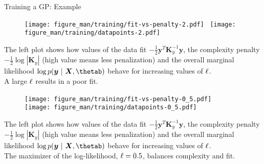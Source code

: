 \begin{vbframe}{Training a GP: Example}
\framebreak

\begin{figure}
	\texttt{[image: figure\_man/training/fit-vs-penalty-2.pdf]}~	\texttt{[image: figure\_man/training/datapoints-2.pdf]}
\end{figure}

\begin{footnotesize}
	The left plot shows how values of the data fit $-\frac{1}{2}\bm{y}^T\bm{K}_y^{-1} \bm{y}$, the complexity penalty $- \frac{1}{2} \log \left| \bm{K}_y \right|$ (high value means less penalization) and the overall marginal likelihood $\log p(\bm{y} ~|~ \bm{X}, \thetab)$ behave for increasing values of $\ell$.\\ 
	A large $\ell$ results in a poor fit. 
\end{footnotesize}

\framebreak 

\begin{figure}
	\texttt{[image: figure\_man/training/fit-vs-penalty-0\_5.pdf]}~	\texttt{[image: figure\_man/training/datapoints-0\_5.pdf]}
\end{figure}

\begin{footnotesize}
	The left plot shows how values of the data fit $-\frac{1}{2}\bm{y}^T\bm{K}_y^{-1} \bm{y}$, the complexity penalty $- \frac{1}{2} \log \left| \bm{K}_y \right|$ (high value means less penalization) and the overall marginal likelihood $\log p(\bm{y} ~|~ \bm{X}, \thetab)$ behave for increasing values of $\ell$.\\ 
	The maximizer of the log-likelihood, $\ell = 0.5$, balances complexity and fit. 
\end{footnotesize}


\end{vbframe}

